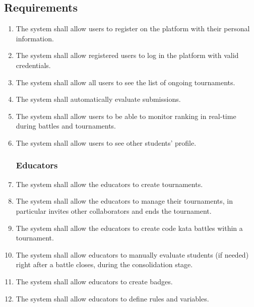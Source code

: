     \subsection{Requirements}
        \begin{enumerate}[series=requirements, label=\textbf{R.\arabic*}]
            \subsubsection*{Users}
            \item {} {The system shall allow users to register on the platform with their personal information.}
            \item {} {The system shall allow registered users to log in the platform with valid credentials.}
            \item {} {The system shall allow all users to see the list of ongoing tournaments.}
            \item {} {The system shall automatically evaluate submissions.}
            \item {} {The system shall allow users to be able to monitor ranking in real-time during battles and tournaments.}
            \item {} {The system shall allow users to see other students' profile.}
            
            \subsubsection*{Educators}
            \item {} {The system shall allow the educators to create tournaments.}
            \item {} {The system shall allow the educators to manage their tournaments, in particular invites other collaborators and ends the tournament.}
            \item {} {The system shall allow the educators to create code kata battles within a tournament.}
             \item {} {The system shall allow educators to manually evaluate students (if needed) right after a battle closes, during the consolidation stage.}
            \item {} {The system shall allow educators to create badges.}
            \item {} {The system shall allow educators to define rules and variables.}


\end{enumerate}
